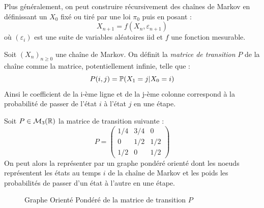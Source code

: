 Plus généralement, on peut construire récursivement des chaînes de Markov en définissant un $X_0$ fixé ou tiré par une 
loi $ \pi_0$ puis en posant : 
    \[ X_{n+1} = f(X_n, \varepsilon_{n+1}) \]
où $( \varepsilon_i)$ est une suite de variables aléatoires iid et $f$ une fonction mesurable. 

\begin{definition}
    Soit $(X_n)_{n \geqslant 0}$ une chaîne de Markov. On définit la \emph{matrice de transition} $P$ 
    de la chaîne comme la matrice, potentiellement infinie, telle que : 
        \[ P(i,j) = \mathbb{P}(X_1 = j | X_0 = i) \] 
    Ainsi le coefficient de la i-ème ligne et de la j-ème colonne correspond à la probabilité de passer 
    de l'état $i$ à l'état $j$ en une étape.   
\end{definition}

\begin{example}
    Soit $P \in \mathcal{M}_3(\mathbb{R})$ la matrice de transition suivante : 
        \[ P = 
            \begin{pmatrix}
                1/4 & 3/4 & 0 \\ 
                0 & 1/2 & 1/2 \\ 
                1/2 & 0 & 1/2 
            \end{pmatrix}  \]
    On peut alors la représenter par un graphe pondéré orienté dont les noeuds représentent les 
    états au temps $i$ de la chaîne de Markov et les poids les probabilités de passer d'un état à l'autre en une étape. 
    
    \begin{figure}[h!]
        \centering
        \caption{Graphe Orienté Pondéré de la matrice de transition $P$}
    \end{figure}
\end{example}

